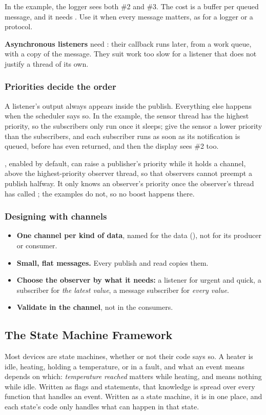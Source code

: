 \noindent In the example, the logger sees both \#2 and \#3. The cost is a buffer per queued message,
and it needs . Use it when every message matters, as for a logger
or a protocol.

\textbf{Asynchronous listeners} need : their callback runs later,
from a work queue, with a copy of the message. They suit work too slow for a listener that does not
justify a thread of its own.

\subsubsection{Priorities decide the order}
A listener’s output always appears inside the publish. Everything else happens when the scheduler
says so. In the example, the sensor thread has the highest priority, so the subscribers only run
once it sleeps; give the sensor a lower priority than the subscribers, and each subscriber runs as
soon as its notification is queued, before  has even returned, and then the
display sees \#2 too.

, enabled by default, can raise a publisher’s priority while it
holds a channel, above the highest-priority observer thread, so that observers cannot preempt a
publish halfway. It only knows an observer’s priority once the observer’s thread has called
; the examples do not, so no boost happens there.

\subsubsection{Designing with channels}
\begin{itemize}
  \item \textbf{One channel per kind of data}, named for the data (), not for its
    producer or consumer.
  \item \textbf{Small, flat messages.} Every publish and read copies them.
  \item \textbf{Choose the observer by what it needs:} a listener for urgent and quick, a subscriber for
    \emph{the latest value}, a message subscriber for \emph{every value}.
  \item \textbf{Validate in the channel}, not in the consumers.
\end{itemize}

\subsection{The State Machine Framework}
Most devices are state machines, whether or not their code says so. A heater is idle, heating,
holding a temperature, or in a fault, and what an event means depends on which: \emph{temperature
reached} matters while heating, and means nothing while idle. Written as flags and 
statements, that knowledge is spread over every function that handles an event. Written as a state
machine, it is in one place, and each state’s code only handles what can happen in that state.

